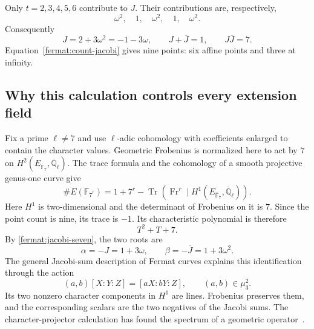 \documentclass[11pt]{article}
\theoremstyle{remark}
\begin{document}
Only \(t=2,3,4,5,6\) contribute to \(J\). Their contributions are, respectively,
\[
\omega^2,\quad1,\quad\omega^2,\quad1,\quad\omega^2.
\]
Consequently
\begin{equation}
J=2+3\omega^2=-1-3\omega,
\qquad J+\overline J=1,
\qquad J\overline J=7.
\label{fermat:jacobi-seven}
\end{equation}
Equation~\eqref{fermat:count-jacobi} gives nine points: six affine points and three at infinity.

\subsection{Why this calculation controls every extension field}

Fix a prime \(\ell\ne7\) and use \(\ell\)-adic cohomology with coefficients enlarged to contain the character values. Geometric Frobenius is normalized here to act by \(7\) on \(H^2(E_{\overline{\mathbb F}_7},\overline{\mathbb Q}_\ell)\). The trace formula and the cohomology of a smooth projective genus-one curve give
\begin{equation}
\#E(\mathbb F_{7^r})=1+7^r-\operatorname{Tr}
\left(\operatorname{Fr}^r\mid H^1(E_{\overline{\mathbb F}_7},
\overline{\mathbb Q}_\ell)\right).
\label{fermat:trace}
\end{equation}
Here \(H^1\) is two-dimensional and the determinant of Frobenius on it is \(7\). Since the point count is nine, its trace is \(-1\). Its characteristic polynomial is therefore
\[
T^2+T+7.
\]
By \eqref{fermat:jacobi-seven}, the two roots are
\begin{equation}
\alpha=-J=1+3\omega,\qquad
\beta=-\overline J=1+3\omega^2.
\label{fermat:eigenvalues}
\end{equation}
The general Jacobi-sum description of Fermat curves explains this identification through the action
\[
(a,b)[X:Y:Z]=[aX:bY:Z],\qquad(a,b)\in\mu_3^2.
\]
Its two nonzero character components in \(H^1\) are lines. Frobenius preserves them, and the corresponding scalars are the two negatives of the Jacobi sums. The character-projector calculation has found the spectrum of a geometric operator~\cite{elkies-gauss}.
\end{document}

